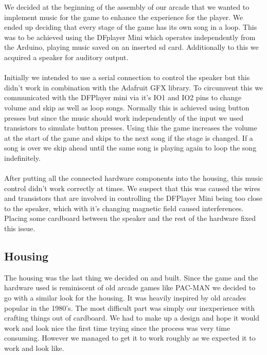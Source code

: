 \documentclass[12pt, a4paper]{article}
\begin{document}
We decided at the beginning of the assembly of our arcade that we wanted to implement music for the game to enhance the experience for the player. We ended up deciding that every stage of the game has its own song in a loop. This was to be achieved using the DFplayer Mini which operates independently from the Arduino, playing music saved on an inserted sd card. Additionally to this we acquired a speaker for auditory output.\\\\
Initially we intended to use a serial connection to control the speaker but this didn't work in combination with the Adafruit GFX library. To circumvent this we communicated with the DFPlayer mini via it's IO1 and IO2 pins to change volume and skip as well as loop songs. Normally this is achieved using button presses but since the music should work independently of the input we used transistors to simulate button presses. Using this the game increases the volume at the start of the game and skips to the next song if the stage is changed. If a song is over we skip ahead until the same song is playing again to loop the song indefinitely. \\\\
After putting all the connected hardware components into the housing, this music control didn't work correctly at times. We suspect that this was caused the wires and transistors that are involved in controlling the DFPlayer Mini being too close to the speaker, which with it's changing magnetic field caused interferences. Placing some cardboard between the speaker and the rest of the hardware fixed this issue. 

\subsection*{Housing}

The housing was the last thing we decided on and built. Since the game and the hardware used is reminiscent of old arcade games like PAC-MAN we decided to go with a similar look for the housing. It was heavily inspired by old arcades popular in the 1980's. The most difficult part was simply our inexperience with crafting things out of cardboard. We had to make up a design and hope it would work and look nice the first time trying since the process was very time consuming. However we managed to get it to work roughly as we expected it to work and look like.
\end{document}
